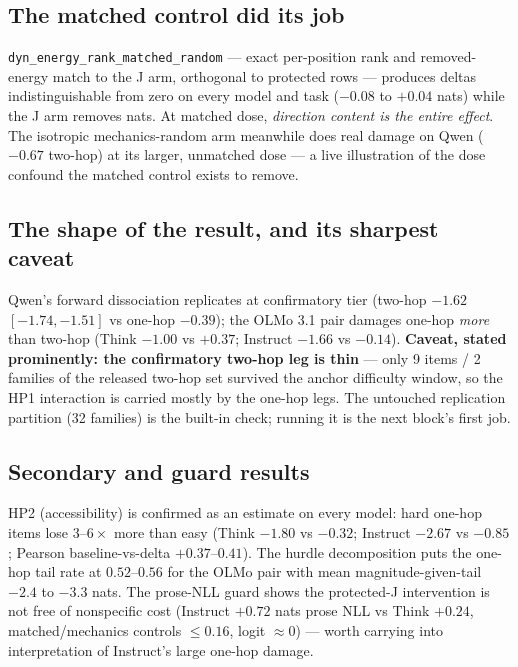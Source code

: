 \documentclass[10pt]{article}
\newcommand{\code}[1]{\texttt{\small #1}}
\begin{document}
\subsection{The matched control did its job}

\code{dyn\_energy\_rank\_matched\_random} --- exact per-position rank and
removed-energy match to the J arm, orthogonal to protected rows ---
produces deltas indistinguishable from zero on every model and task
($-0.08$ to $+0.04$ nats) while the J arm removes nats. At matched dose,
\emph{direction content is the entire effect}. The isotropic
mechanics-random arm meanwhile does real damage on Qwen ($-0.67$
two-hop) at its larger, unmatched dose --- a live illustration of the
dose confound the matched control exists to remove.

\subsection{The shape of the result, and its sharpest caveat}

Qwen's forward dissociation replicates at confirmatory tier (two-hop
$-1.62$ $[-1.74,-1.51]$ vs one-hop $-0.39$); the OLMo 3.1 pair damages
one-hop \emph{more} than two-hop (Think $-1.00$ vs $+0.37$; Instruct
$-1.66$ vs $-0.14$). \textbf{Caveat, stated prominently: the
confirmatory two-hop leg is thin} --- only 9 items / 2 families of the
released two-hop set survived the anchor difficulty window, so the HP1
interaction is carried mostly by the one-hop legs. The untouched
replication partition (32 families) is the built-in check; running it is
the next block's first job.

\subsection{Secondary and guard results}

HP2 (accessibility) is confirmed as an estimate on every model: hard
one-hop items lose $3$--$6\times$ more than easy (Think $-1.80$ vs
$-0.32$; Instruct $-2.67$ vs $-0.85$; Pearson baseline-vs-delta
$+0.37$--$0.41$). The hurdle decomposition puts the one-hop tail rate at
$0.52$--$0.56$ for the OLMo pair with mean magnitude-given-tail $-2.4$
to $-3.3$ nats. The prose-NLL guard shows the protected-J intervention
is not free of nonspecific cost (Instruct $+0.72$ nats prose NLL vs
Think $+0.24$, matched/mechanics controls $\leq 0.16$, logit $\approx
0$) --- worth carrying into interpretation of Instruct's large one-hop
damage.
\end{document}
